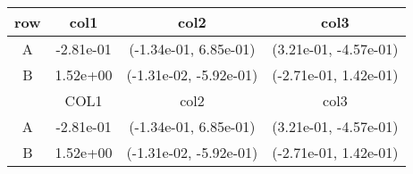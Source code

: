 \begin{tabular}{cccc}
\toprule
row&col1&col2&col3\tabularnewline
\midrule
A&-2.81e-01& (-1.34e-01, 6.85e-01)& (3.21e-01, -4.57e-01)\tabularnewline
B&1.52e+00& (-1.31e-02, -5.92e-01)& (-2.71e-01, 1.42e-01)\tabularnewline
\midrule
&COL1&col2&col3\tabularnewline
\midrule
A&-2.81e-01& (-1.34e-01, 6.85e-01)& (3.21e-01, -4.57e-01)\tabularnewline
B&1.52e+00& (-1.31e-02, -5.92e-01)& (-2.71e-01, 1.42e-01)\tabularnewline
\bottomrule
\end{tabular}

